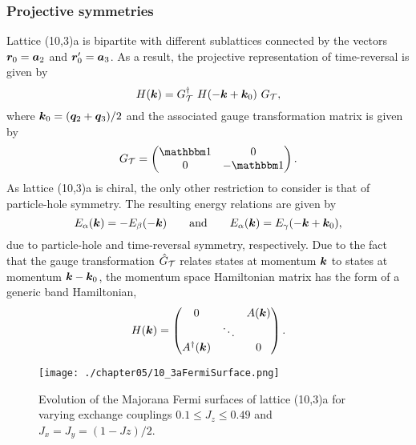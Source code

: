 \subsubsection{Projective symmetries}
%
%
Lattice (10,3)a is bipartite with different sublattices connected by the vectors $\bm{r}_0 = \bm{a}_2$ and $\bm{r}'_0 = \bm{a}_3$.
As a result, the projective representation of time-reversal is given by
%
\begin{equation}
	H(\bm{k}) = G^{\dagger}_{\mathcal{T}}~H(-\bm{k} + \bm{k}_0)~G_{\mathcal{T}},
\end{equation}
%
where $\bm{k}_0 = (\bm{q}_2 + \bm{q}_3)/2$ and the associated gauge transformation matrix is given by
%
\begin{equation}
	G_{\mathcal{T}} =
	\begin{pmatrix}
		\id	& 0    \\
		0	& -\id
	\end{pmatrix}.
\end{equation}
%
As lattice (10,3)a is chiral, the only other restriction to consider is that of particle-hole symmetry.
The resulting energy relations are given by
%
\begin{equation}
	E_{\alpha}(\bm{k}) = -E_{\beta}(-\bm{k}) \qquad {\rm and } \qquad E_{\alpha}(\bm{k}) = E_{\gamma}(-\bm{k} + \bm{k}_0),
\end{equation}
%
due to particle-hole and time-reversal symmetry, respectively.
Due to the fact that the gauge transformation $\hat{G}_{\mathcal{T}}$ relates states at momentum $\bm{k}$ to states at momentum $\bm{k} - \bm{k}_0$, the momentum space Hamiltonian matrix has the form of a generic band Hamiltonian,
%
\begin{equation}
	H(\bm{k}) =
		\begin{pmatrix}
			0			&		 & A(\bm{k}) \\
						& \ddots &		  \\
			A^{\dagger}(\bm{k})	&		 & 0
		\end{pmatrix}.
\end{equation}
%
%
\begin{figure}[tb]
	\centering
	\texttt{[image: ./chapter05/10\_3aFermiSurface.png]}
	\caption{
		Evolution of the Majorana Fermi surfaces of lattice (10,3)a for varying exchange couplings $0.1 \leq J_z \leq 0.49$ and $J_x = J_y = (1 - Jz)/2$.
	}
	\label{fig:chapter05_10_3aFermiSurfaces}
\end{figure}
%


%
%
